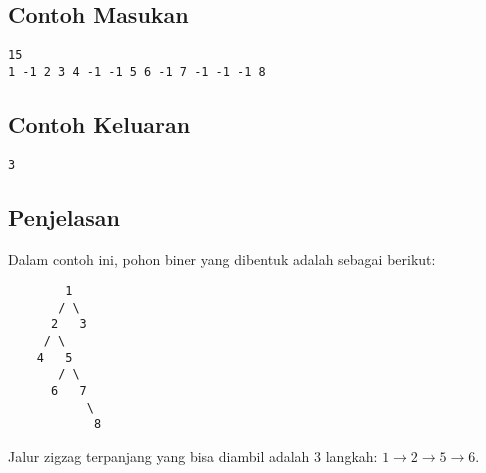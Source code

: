 \documentclass{article}
\begin{document}
\begin{multicols}{2}
\subsection*{Contoh Masukan}
\begin{lstlisting}
15
1 -1 2 3 4 -1 -1 5 6 -1 7 -1 -1 -1 8
\end{lstlisting}
\columnbreak
\subsection*{Contoh Keluaran}
\begin{lstlisting}
3
\end{lstlisting}
\end{multicols}

\subsection*{Penjelasan}

Dalam contoh ini, pohon biner yang dibentuk adalah sebagai berikut:
\begin{verbatim}
        1
       / \
      2   3
     / \
    4   5
       / \
      6   7
           \
            8
\end{verbatim}

Jalur zigzag terpanjang yang bisa diambil adalah 3 langkah:
$1 \xrightarrow{} 2 \xrightarrow{} 5 \xrightarrow{} 6.$
\end{document}
